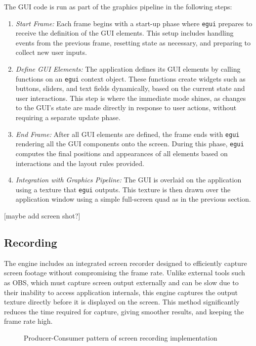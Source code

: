 The GUI code is run as part of the graphics pipeline in the following steps:
\begin{enumerate}
\item \emph{Start Frame:} Each frame begins with a start-up phase where \verb|egui| prepares to receive the definition of the GUI elements. This setup includes handling events from the previous frame, resetting state as necessary, and preparing to collect new user inputs.

\item \emph{Define GUI Elements:} The application defines its GUI elements by calling functions on an \verb|egui| context object. These functions create widgets such as buttons, sliders, and text fields dynamically, based on the current state and user interactions. This step is where the immediate mode shines, as changes to the GUI's state are made directly in response to user actions, without requiring a separate update phase.

\item \emph{End Frame:} After all GUI elements are defined, the frame ends with \verb|egui| rendering all the GUI components onto the screen. During this phase, \verb|egui| computes the final positions and appearances of all elements based on interactions and the layout rules provided.

\item \emph{Integration with Graphics Pipeline:} The GUI is overlaid on the application using a texture that \verb|egui| outputs. This texture is then drawn over the application window using a simple full-screen quad as in the previous section.
\end{enumerate}

[maybe add screen shot?]
\subsection{Recording}

The engine includes an integrated screen recorder designed to efficiently capture screen footage without compromising the frame rate. Unlike external tools such as OBS, which must capture screen output externally and can be slow due to their inability to access application internals, this engine captures the output texture directly before it is displayed on the screen. This method significantly reduces the time required for capture, giving smoother results, and keeping the frame rate high.

\begin{figure}[H]
  \centering
  
  \caption{Producer-Consumer pattern of screen recording implementation}
\end{figure}


